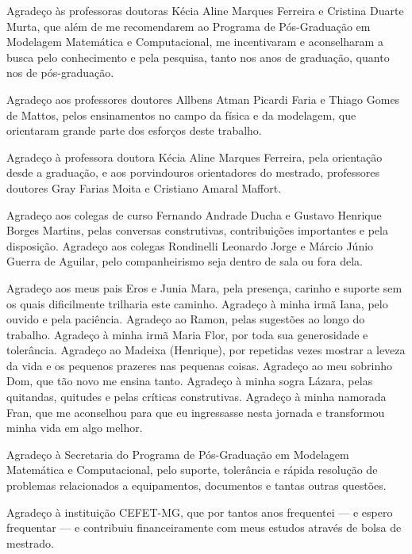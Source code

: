 
%

\begin{agradecimentos}

Agradeço às professoras doutoras Kécia Aline Marques Ferreira e Cristina Duarte
Murta, que além de me recomendarem ao Programa de Pós-Graduação em Modelagem
Matemática e Computacional, me incentivaram e aconselharam a busca pelo
conhecimento e pela pesquisa, tanto nos anos de graduação, quanto nos de
pós-graduação.

Agradeço aos professores doutores Allbens Atman Picardi Faria e Thiago Gomes de
Mattos, pelos ensinamentos no campo da física e da modelagem, que orientaram
grande parte dos esforços deste trabalho.

Agradeço à professora doutora Kécia Aline Marques Ferreira, pela orientação
desde a graduação, e aos porvindouros orientadores do mestrado, professores
doutores Gray Farias Moita e Cristiano Amaral Maffort.

Agradeço aos colegas de curso Fernando Andrade Ducha e Gustavo Henrique Borges
Martins, pelas conversas construtivas, contribuições importantes e pela
disposição. Agradeço aos colegas Rondinelli Leonardo Jorge e Márcio Júnio Guerra
de Aguilar, pelo companheirismo seja dentro de sala ou fora dela.

Agradeço aos meus pais Eros e Junia Mara, pela presença, carinho e suporte sem
os quais dificilmente trilharia este caminho.
Agradeço à minha irmã Iana, pelo ouvido e pela paciência.
Agradeço ao Ramon, pelas sugestões ao longo do trabalho.
Agradeço à minha irmã Maria Flor, por toda sua generosidade e tolerância.
Agradeço ao Madeixa (Henrique), por repetidas vezes mostrar a leveza
da vida e os pequenos prazeres nas pequenas coisas. 
Agradeço ao meu sobrinho Dom, que tão novo me ensina tanto.
Agradeço à minha sogra Lázara, pelas quitandas, quitudes e pelas críticas
construtivas.
Agradeço à minha namorada Fran, que me aconselhou para que eu ingressasse nesta
jornada e transformou minha vida em algo melhor.

Agradeço à Secretaria do Programa de Pós-Graduação em Modelagem Matemática e
Computacional, pelo suporte, tolerância e rápida resolução de problemas
relacionados a equipamentos, documentos e tantas outras questões.

Agradeço à instituição CEFET-MG, que por tantos anos frequentei --- e espero
frequentar --- e contribuiu financeiramente com meus estudos através de bolsa de
mestrado.

\end{agradecimentos}
